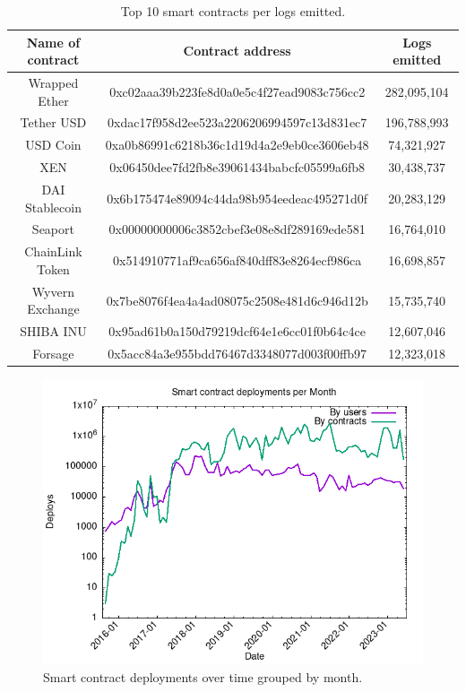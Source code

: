 \begin{table}[!ht]
\centering
    \begin{threeparttable}
    \begin{tabular}{ c c c } 
    \toprule
    \textbf{Name of contract} & \textbf{Contract address} & \textbf{Logs emitted} \\
    \midrule
       Wrapped Ether & \small{0xc02aaa39b223fe8d0a0e5c4f27ead9083c756cc2} & 282,095,104  \\ [1.2ex]
       Tether USD  & \small{0xdac17f958d2ee523a2206206994597c13d831ec7} & 196,788,993  \\ [1.2ex]
       USD Coin & \small{0xa0b86991c6218b36c1d19d4a2e9eb0ce3606eb48} & 74,321,927  \\ [1.2ex]
       XEN & \small{0x06450dee7fd2fb8e39061434babcfc05599a6fb8} & 30,438,737  \\ [1.2ex]
       DAI Stablecoin& \small{0x6b175474e89094c44da98b954eedeac495271d0f} & 20,283,129  \\ [1.2ex]
       Seaport & \small{0x00000000006c3852cbef3e08e8df289169ede581} & 16,764,010  \\ [1.2ex]
       ChainLink Token & \small{0x514910771af9ca656af840dff83e8264ecf986ca} & 16,698,857  \\ [1.2ex]
       Wyvern Exchange & \small{0x7be8076f4ea4a4ad08075c2508e481d6c946d12b} & 15,735,740  \\ [1.2ex]
       SHIBA INU & \small{0x95ad61b0a150d79219dcf64e1e6cc01f0b64c4ce} & 12,607,046  \\ [1.2ex]
       Forsage & \small{0x5acc84a3e955bdd76467d3348077d003f00ffb97} & 12,323,018  \\ [1.2ex]  
    \bottomrule
    \end{tabular}
    \end{threeparttable}
    \caption{Top 10 smart contracts per logs emitted.}
    \label{table:top-logs-emitters}
\end{table}

\begin{figure}[!ht]
    \centering
    \includegraphics[width=1\textwidth]{Figures/analysis/deploys_per_month.png}
    \caption{Smart contract deployments over time grouped by month.}
    \label{fig:deploy-history}
\end{figure}


